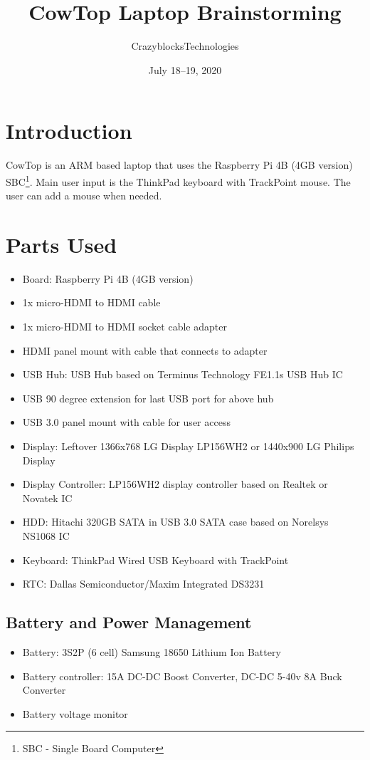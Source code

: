 \documentclass[12pt]{article}
\title{\textbf{CowTop Laptop Brainstorming}}
\author{CrazyblocksTechnologies}
\date{July 18--19, 2020}
\begin{document}
\maketitle

\tableofcontents

\section{Introduction}

CowTop is an ARM based laptop that uses the Raspberry Pi 4B (4GB version) SBC\footnote{SBC - Single Board Computer}. Main user input is the ThinkPad keyboard with TrackPoint mouse. The user can add a mouse when needed. 

\pagebreak
\section{Parts Used}
\begin{itemize}
\item Board: Raspberry Pi 4B (4GB version)
\item 1x micro-HDMI to HDMI cable
\item 1x micro-HDMI to HDMI socket cable adapter 
\item HDMI panel mount with cable that connects to adapter
\item USB Hub: USB Hub based on Terminus Technology FE1.1s USB Hub IC
\item USB 90 degree extension for last USB port for above hub
\item USB 3.0 panel mount with cable for user access
\item Display: Leftover 1366x768 LG Display LP156WH2 or 1440x900 LG Philips Display
\item Display Controller: LP156WH2 display controller based on Realtek or Novatek IC
\item HDD: Hitachi 320GB SATA in USB 3.0 SATA case based on Norelsys NS1068 IC
\item Keyboard: ThinkPad Wired USB Keyboard with TrackPoint
\item RTC: Dallas Semiconductor/Maxim Integrated DS3231
\end{itemize}
\subsection{Battery and Power Management}
\begin{itemize}
\item Battery: 3S2P (6 cell) Samsung 18650 Lithium Ion Battery
\item Battery controller: 15A DC-DC Boost Converter, DC-DC 5-40v 8A Buck Converter
\item Battery voltage monitor
\end{itemize}
\end{document}
